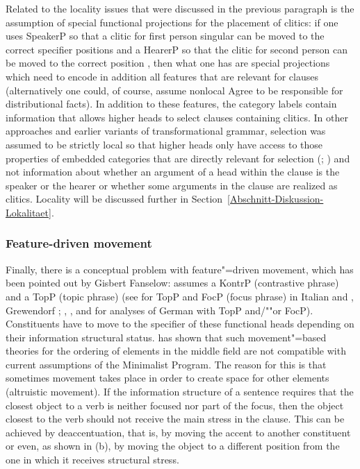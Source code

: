 Related to the locality issues that were discussed in the previous paragraph is the assumption of
special functional projections for the placement of clitics: if one uses
SpeakerP so that a clitic for first person singular can be moved to
the correct specifier positions and a HearerP so that the clitic for
second person can be moved to the correct position \citep[]{Poletto2000a-u}, then what one
has are special projections which need to encode in addition all features that are relevant for
clauses (alternatively one could, of course, assume nonlocal Agree to be responsible for distributional facts). In
addition to these features, the category labels contain information that allows higher heads to select clauses
containing clitics. In other approaches and earlier variants of transformational grammar, selection
was assumed to be strictly local so that higher heads only have access to those
properties of embedded categories that are directly relevant for selection (\citealp[]{Abraham2005a}; \citealp{Sag2007a}) and not information about whether an argument of a head within the clause is
the speaker or the hearer or whether some arguments in the clause are realized as clitics. Locality
will be discussed further in Section~\ref{Abschnitt-Diskussion-Lokalitaet}.

\subsubsection{Feature-driven movement}
\label{sec-feature-driven-movement}

Finally, there is a conceptual problem with feature"=driven movement, which has been pointed out by Gisbert Fanselow:
\mbox{}\citet[]{Frey2004a} assumes a KontrP 
(contrastive phrase) and \citet{Frey2004b-u} a TopP (topic phrase) (see  for TopP and
FocP (focus phrase) in Italian and  
, Grewendorf \citeyearpar[, 240]{Grewendorf2002a}; \citeyear{Grewendorf2009a},
,  and  for analyses of German with TopP and/""or FocP). 
Constituents have to move to the specifier of these functional heads depending on their information structural status. \citet{Fanselow2003b} has
shown that such movement"=based theories for the ordering of elements in the middle field are not compatible with current assumptions of the 
Minimalist Program\indexmp. The reason for this is that sometimes movement takes place in order to create space for other elements (altruistic 
movement).
If the information structure of a sentence requires that the closest object to a verb is neither
focused nor part of the focus, then the object closest to the verb should not
receive the main stress in the clause. This can be achieved by deaccentuation, that is, by moving
the accent to another constituent or even, as shown in (b), by moving the object to a different position from the one in which it receives structural stress.

